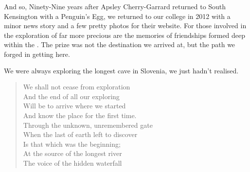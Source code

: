 
And so, Ninety-Nine years after Apsley Cherry-Garrard returned to South
Kensington with a Penguin's Egg, we returned to our college in 2012 with
a minor news story and a few pretty photos for their website. For those
involved in the exploration of  far more precious are
the memories of friendships formed deep within the . The
prize was not the destination we arrived at, but the path we forged in
getting here.

We were always exploring the longest cave in Slovenia, we just hadn't realised.


\newpage
\begin{verse}
We shall not cease from exploration  \\
And the end of all our exploring  \\
Will be to arrive where we started  \\
And know the place for the first time. 
 \\
Through the unknown, unremembered gate  \\
When the last of earth left to discover  \\
Is that which was the beginning;  \\
At the source of the longest river  \\
The voice of the hidden waterfall \\
\end{verse}

